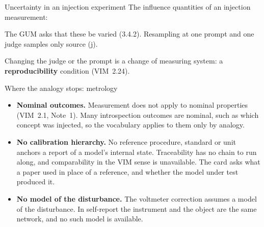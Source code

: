 \documentclass[aspectratio=169,11pt]{beamer}
\begin{document}
\begin{frame}[label=llmunc]{Uncertainty in an injection experiment}
The influence quantities of an injection measurement:

\vspace{0.3em}
\begin{center}
\end{center}

\vspace{0.3em}
The GUM asks that these be varied (3.4.2). Resampling at one prompt and one judge samples only source (j).

\vspace{0.2em}
{\small Changing the judge or the prompt is a change of measuring system: a \textbf{reproducibility} condition (VIM~2.24).}
\end{frame}

\begin{frame}[label=limitsmet]{Where the analogy stops: metrology}
\begin{itemize}\setlength\itemsep{8pt}
  \item {\small \textbf{Nominal outcomes.} Measurement does not apply to nominal properties (VIM~2.1, Note~1). Many introspection outcomes are nominal, such as which concept was injected, so the vocabulary applies to them only by analogy.}
  \item {\small \textbf{No calibration hierarchy.} No reference procedure, standard or unit anchors a report of a model's internal state. Traceability has no chain to run along, and comparability in the VIM sense is unavailable. The card asks what a paper used in place of a reference, and whether the model under test produced it.}
  \item {\small \textbf{No model of the disturbance.} The voltmeter correction assumes a model of the disturbance. In self-report the instrument and the object are the same network, and no such model is available.}
\end{itemize}
\end{frame}
\end{document}
